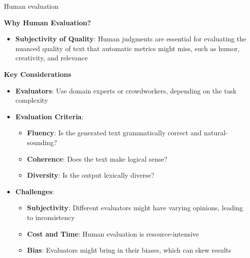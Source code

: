 \documentclass[11pt,compress,t,notes=noshow, xcolor=table]{beamer}
\begin{document}
\begin{vbframe}{Human evaluation}

\textbf{Why Human Evaluation?}
\begin{itemize}
    \item \textbf{Subjectivity of Quality}: Human judgments are essential for evaluating the nuanced quality of text that automatic metrics might miss, such as humor, creativity, and relevance
\end{itemize}

\textbf{Key Considerations}
\begin{itemize}
    \item \textbf{Evaluators}: Use domain experts or crowdworkers, depending on the task complexity
    \item \textbf{Evaluation Criteria}:
    \begin{itemize}
        \item \textbf{Fluency}: Is the generated text grammatically correct and natural-sounding?
        \item \textbf{Coherence}: Does the text make logical sense?
        \item \textbf{Diversity}: Is the output lexically diverse?
    \end{itemize}
    \item \textbf{Challenges}: 
    \begin{itemize}
        \item \textbf{Subjectivity}: Different evaluators might have varying opinions, leading to inconsistency
        \item \textbf{Cost and Time}: Human evaluation is resource-intensive
        \item \textbf{Bias}: Evaluators might bring in their biases, which can skew results
    \end{itemize}
\end{itemize}
   
\end{vbframe}


\endlecture
\end{document}
